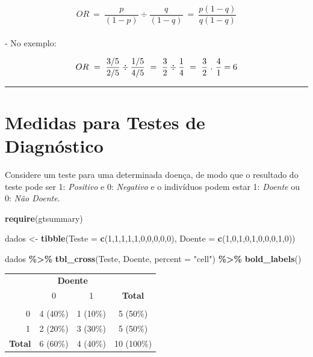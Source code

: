 \documentclass[
]{book}
\newenvironment{Shaded}{\begin{snugshade}}{\end{snugshade}}
\newcommand{\AttributeTok}[1]{\textcolor[rgb]{0.13,0.29,0.53}{#1}}
\newcommand{\DecValTok}[1]{\textcolor[rgb]{0.00,0.00,0.81}{#1}}
\newcommand{\FunctionTok}[1]{\textcolor[rgb]{0.13,0.29,0.53}{\textbf{#1}}}
\newcommand{\NormalTok}[1]{#1}
\newcommand{\OtherTok}[1]{\textcolor[rgb]{0.56,0.35,0.01}{#1}}
\newcommand{\SpecialCharTok}[1]{\textcolor[rgb]{0.81,0.36,0.00}{\textbf{#1}}}
\newcommand{\StringTok}[1]{\textcolor[rgb]{0.31,0.60,0.02}{#1}}
\begin{document}
\[OR ~=~ \frac{p}{(1-p)} \div \frac{q}{(1-q)} ~=~  \frac{p(1-q)}{q(1-q)}\]\\
- No exemplo:

\[OR ~=~ \frac{3/5}{2/5} \div \frac{1/5}{4/5} ~=~ \frac{3}{2} \div {1 \over 4} ~=~ \frac{3}{2} ~.~  \frac{4}{1} =  6\]

\begin{center}\rule{0.5\linewidth}{0.5pt}\end{center}

\section{Medidas para Testes de Diagnóstico}\label{medidas-para-testes-de-diagnuxf3stico}

Considere um teste para uma determinada doença, de modo que o resultado do teste pode ser 1: \emph{Positivo} e 0: \emph{Negativo} e o indivíduos podem estar 1: \emph{Doente} ou 0: \emph{Não Doente}.

\begin{Shaded}
\begin{Highlighting}[]
\FunctionTok{require}\NormalTok{(gtsummary)}

\NormalTok{dados }\OtherTok{\textless{}{-}} \FunctionTok{tibble}\NormalTok{(}\AttributeTok{Teste =} \FunctionTok{c}\NormalTok{(}\DecValTok{1}\NormalTok{,}\DecValTok{1}\NormalTok{,}\DecValTok{1}\NormalTok{,}\DecValTok{1}\NormalTok{,}\DecValTok{1}\NormalTok{,}\DecValTok{0}\NormalTok{,}\DecValTok{0}\NormalTok{,}\DecValTok{0}\NormalTok{,}\DecValTok{0}\NormalTok{,}\DecValTok{0}\NormalTok{),}
                \AttributeTok{Doente =} \FunctionTok{c}\NormalTok{(}\DecValTok{1}\NormalTok{,}\DecValTok{0}\NormalTok{,}\DecValTok{1}\NormalTok{,}\DecValTok{0}\NormalTok{,}\DecValTok{1}\NormalTok{,}\DecValTok{0}\NormalTok{,}\DecValTok{0}\NormalTok{,}\DecValTok{0}\NormalTok{,}\DecValTok{1}\NormalTok{,}\DecValTok{0}\NormalTok{))}

\NormalTok{dados }\SpecialCharTok{\%\textgreater{}\%} \FunctionTok{tbl\_cross}\NormalTok{(Teste, Doente, }\AttributeTok{percent =} \StringTok{"cell"}\NormalTok{) }\SpecialCharTok{\%\textgreater{}\%}
  \FunctionTok{bold\_labels}\NormalTok{()}
\end{Highlighting}
\end{Shaded}

\begin{table}[t]
\fontsize{12.0pt}{14.4pt}\selectfont
\begin{tabular*}{\linewidth}{@{\extracolsep{\fill}}lccc}
\toprule
 & \multicolumn{2}{c}{\textbf{Doente}} &  \\ 
\cmidrule(lr){2-3}
 & 0 & 1 & \textbf{Total} \\ 
\midrule\addlinespace[2.5pt]
{\bfseries Teste} &  &  &  \\ 
    0 & 4 (40\%) & 1 (10\%) & 5 (50\%) \\ 
    1 & 2 (20\%) & 3 (30\%) & 5 (50\%) \\ 
{\bfseries Total} & 6 (60\%) & 4 (40\%) & 10 (100\%) \\ 
\bottomrule
\end{tabular*}
\end{table}
\end{document}
